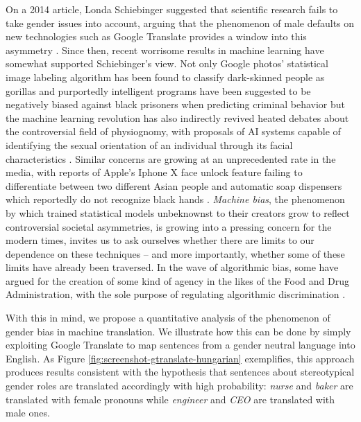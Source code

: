 \documentclass[fleqn,10pt]{article}
\begin{document}
On a 2014 article, Londa Schiebinger suggested that scientific research fails to take gender issues into account, arguing that the phenomenon of male defaults on new technologies such as Google Translate provides a window into this asymmetry \citep{schiebinger2014scientific}. Since then, recent worrisome results in machine learning have somewhat supported Schiebinger's view. Not only Google photos' statistical image labeling algorithm has been found to classify dark-skinned people as gorillas \citep{garcia2016racist} and purportedly intelligent programs have been suggested to be negatively biased against black prisoners when predicting criminal behavior \citep{angwin2016machine} but the machine learning revolution has also indirectly revived heated debates about the controversial field of physiognomy, with proposals of AI systems capable of identifying the sexual orientation of an individual through its facial characteristics \citep{wang2017deep}. Similar concerns are growing at an unprecedented rate in the media, with reports of Apple's Iphone X face unlock feature failing to differentiate between two different Asian people \citep{womanunlockphone2017} and automatic soap dispensers which reportedly do not recognize black hands \citep{racistsoapdispenser2017}. \emph{Machine bias}, the phenomenon by which trained statistical models unbeknownst to their creators grow to reflect controversial societal asymmetries, is growing into a pressing concern for the modern times, invites us to ask ourselves whether there are limits to our dependence on these techniques -- and more importantly, whether some of these limits have already been traversed. In the wave of algorithmic bias, some have argued for the creation of some kind of agency in the likes of the Food and Drug Administration, with the sole purpose of regulating algorithmic discrimination \citep{kirkpatrick2016battling}.

With this in mind, we propose a quantitative analysis of the phenomenon of gender bias in machine translation. We illustrate how this can be done by simply exploiting Google Translate to map sentences from a gender neutral language into English. As Figure \ref{fig:screenshot-gtranslate-hungarian} exemplifies, this approach produces results consistent with the hypothesis that sentences about stereotypical gender roles are translated accordingly with high probability: \emph{nurse} and \emph{baker} are translated with female pronouns while \emph{engineer} and \emph{CEO} are translated with male ones.
\end{document}
